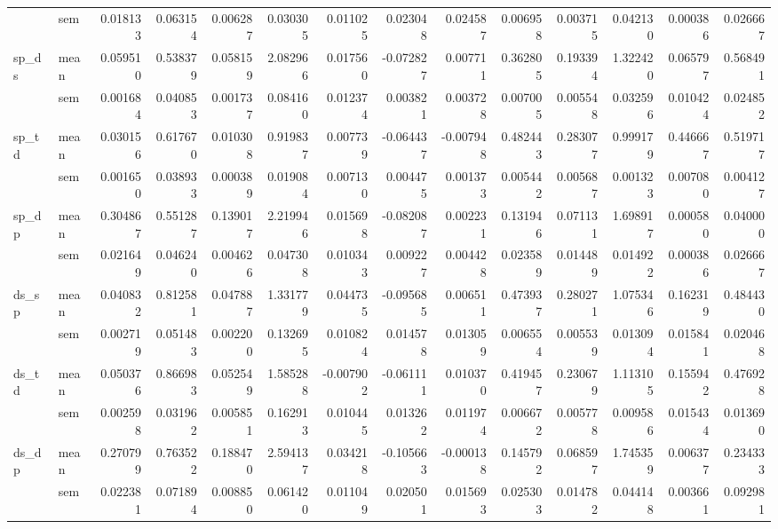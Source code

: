\begin{tabular}{llrrrrrrrrrrrr}
 & sem & 0.018133 & 0.063154 & 0.006287 & 0.030305 & 0.011025 & 0.023048 & 0.024587 & 0.006958 & 0.003715 & 0.042130 & 0.000386 & 0.026667 \\
\cline{1-14}
\multirow[t]{2}{*}{sp_ds} & mean & 0.059510 & 0.538379 & 0.058159 & 2.082966 & 0.017560 & -0.072827 & 0.007711 & 0.362805 & 0.193394 & 1.322420 & 0.065797 & 0.568491 \\
 & sem & 0.001684 & 0.040853 & 0.001737 & 0.084160 & 0.012374 & 0.003821 & 0.003728 & 0.007005 & 0.005548 & 0.032596 & 0.010424 & 0.024852 \\
\cline{1-14}
\multirow[t]{2}{*}{sp_td} & mean & 0.030156 & 0.617670 & 0.010308 & 0.919837 & 0.007739 & -0.064437 & -0.007948 & 0.482443 & 0.283077 & 0.999179 & 0.446667 & 0.519717 \\
 & sem & 0.001650 & 0.038933 & 0.000389 & 0.019084 & 0.007130 & 0.004475 & 0.001373 & 0.005442 & 0.005687 & 0.001323 & 0.007080 & 0.004127 \\
\cline{1-14}
\multirow[t]{2}{*}{sp_dp} & mean & 0.304867 & 0.551287 & 0.139017 & 2.219946 & 0.015698 & -0.082087 & 0.002231 & 0.131946 & 0.071131 & 1.698917 & 0.000580 & 0.040000 \\
 & sem & 0.021649 & 0.046240 & 0.004626 & 0.047308 & 0.010343 & 0.009227 & 0.004428 & 0.023589 & 0.014489 & 0.014922 & 0.000386 & 0.026667 \\
\cline{1-14}
\multirow[t]{2}{*}{ds_sp} & mean & 0.040832 & 0.812581 & 0.047887 & 1.331779 & 0.044735 & -0.095685 & 0.006511 & 0.473937 & 0.280271 & 1.075346 & 0.162319 & 0.484430 \\
 & sem & 0.002719 & 0.051483 & 0.002200 & 0.132695 & 0.010824 & 0.014578 & 0.013059 & 0.006554 & 0.005539 & 0.013094 & 0.015841 & 0.020468 \\
\cline{1-14}
\multirow[t]{2}{*}{ds_td} & mean & 0.050376 & 0.866983 & 0.052549 & 1.585288 & -0.007902 & -0.061111 & 0.010370 & 0.419457 & 0.230679 & 1.113105 & 0.155942 & 0.476928 \\
 & sem & 0.002598 & 0.031962 & 0.005851 & 0.162913 & 0.010445 & 0.013262 & 0.011974 & 0.006672 & 0.005778 & 0.009586 & 0.015434 & 0.013690 \\
\cline{1-14}
\multirow[t]{2}{*}{ds_dp} & mean & 0.270799 & 0.763522 & 0.188470 & 2.594137 & 0.034218 & -0.105663 & -0.000138 & 0.145792 & 0.068597 & 1.745359 & 0.006377 & 0.234333 \\
 & sem & 0.022381 & 0.071894 & 0.008850 & 0.061420 & 0.011049 & 0.020501 & 0.015693 & 0.025303 & 0.014782 & 0.044148 & 0.003661 & 0.092981 \\

\end{tabular}
